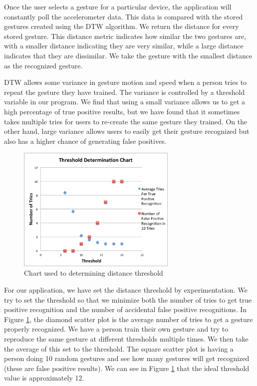 \documentclass[journal]{IEEEtran}
\begin{document}
Once the user selects a gesture for a particular device, the application will constantly poll the accelerometer data. This data is compared with the stored gestures created using the DTW algorithm. We return the distance for every stored gesture. This distance metric indicates how similar the two gestures are, with a smaller distance indicating they are very similar, while a large distance indicates that they are dissimilar. We take the gesture with the smallest distance as the recognized gesture. 

DTW allows some variance in gesture motion and speed when a person tries to repeat the gesture they have trained. The variance is controlled by a threshold variable in our program. We find that using a small variance allows us to get a high percentage of true positive results, but we have found that it sometimes takes multiple tries for users to re-create the same gesture they trained. On the other hand, large variance allows users to easily get their gesture recognized but also has a higher chance of generating false positives.

\begin{figure}[!t]
\centering
\includegraphics[width=3in]{threshold.png}
\caption{Chart used to determining distance threshold}
\label{threshold}
\end{figure}

	For our application, we have set the distance threshold by experimentation. We try to set the threshold so that we minimize both the number of tries to get true positive recognition and the number of accidental false positive recognitions. In Figure \ref{threshold}, the diamond scatter plot is the average number of tries to get a gesture properly recognized. We have a person train their own gesture and try to reproduce the same gesture at different thresholds multiple times. We then take the average of this set to the threshold. The square scatter plot is having a person doing 10 random gestures and see how many gestures will get recognized (these are false positive results). We can see in Figure \ref{threshold} that the ideal threshold value is approximately 12.
\end{document}

